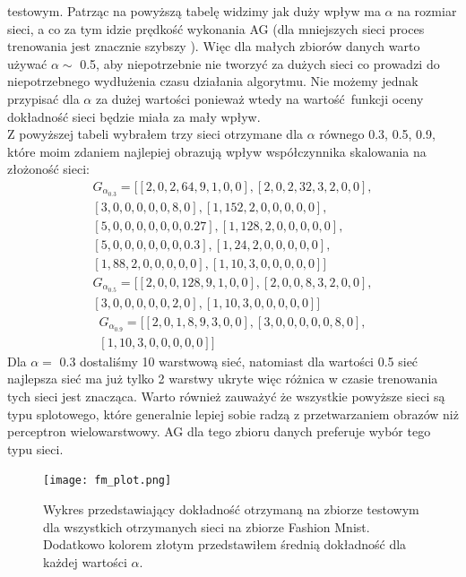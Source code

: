 \documentclass{article}
\begin{document}
testowym.
Patrząc na powyższą tabelę widzimy jak duży wpływ ma $\alpha$ na rozmiar sieci, a co
za tym idzie prędkość wykonania AG (dla mniejszych sieci proces trenowania jest znacznie szybszy
). Więc dla  małych zbiorów danych warto używać $\alpha \sim$ 0.5, aby niepotrzebnie
nie tworzyć za dużych sieci co prowadzi do niepotrzebnego wydłużenia czasu działania algorytmu.
Nie możemy jednak przypisać dla $\alpha$ za dużej wartości ponieważ wtedy na wartość funkcji
oceny dokładność sieci będzie miała za mały wpływ.\\
Z powyższej tabeli wybrałem trzy sieci otrzymane dla $\alpha$ równego 0.3, 0.5, 0.9, które
moim zdaniem najlepiej obrazują wpływ współczynnika skalowania na złożoność sieci:
\begin{align*}
	G_{\alpha_{0.3}} = \big[[2, 0, 2, 64, 9, 1, 0, 0], [2, 0, 2, 32, 3, 2, 0, 0],\\
	                        [3, 0, 0, 0, 0, 0, 8, 0], [1, 152, 2, 0, 0, 0, 0, 0],\\
				[5, 0, 0, 0, 0, 0, 0, 0.27], [1, 128, 2, 0, 0, 0, 0, 0],\\
				[5, 0, 0, 0, 0, 0, 0, 0.3], [1, 24, 2, 0, 0, 0, 0, 0],\\
				[1, 88, 2, 0, 0, 0, 0, 0], [1, 10, 3, 0, 0, 0, 0, 0] \big]
\end{align*}
\begin{align*}
	G_{\alpha_{0.5}} = \big[[2, 0, 0, 128, 9, 1, 0, 0], [2, 0, 0, 8, 3, 2, 0, 0],\\
	                   [3, 0, 0, 0, 0, 0, 2, 0], [1, 10, 3, 0, 0, 0, 0, 0]\big]
\end{align*}
\begin{align*}
	 G_{\alpha_{0.9}} = \big[[2, 0, 1, 8, 9, 3, 0, 0], [3, 0, 0, 0, 0, 0, 8, 0],\\
	                         [1, 10, 3, 0, 0, 0, 0, 0]\big]
\end{align*}
Dla $\alpha = $ 0.3 dostaliśmy 10 warstwową sieć,  natomiast dla wartości 0.5 
sieć najlepsza sieć ma już tylko 2 warstwy ukryte więc różnica w czasie trenowania tych sieci
jest znacząca. Warto również zauważyć że wszystkie powyższe sieci są typu splotowego, które
generalnie lepiej sobie radzą z przetwarzaniem obrazów niż perceptron wielowarstwowy.
AG dla tego zbioru danych preferuje wybór tego typu sieci.
\begin{figure}[H]
\centering
\texttt{[image: fm\_plot.png]}
\caption{Wykres przedstawiający dokładność otrzymaną na zbiorze testowym  dla
wszystkich otrzymanych sieci na zbiorze Fashion Mnist. Dodatkowo kolorem złotym przedstawiłem
średnią dokładność dla każdej wartości $\alpha$.}
\end{figure}
\end{document}

